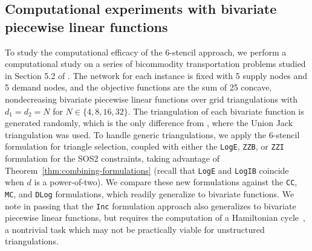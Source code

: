 \documentclass[opre,nonblindrev]{informs3} %
\newcommand{\ZZB}{\texttt{ZZB}}
\newcommand{\ZZI}{\texttt{ZZI}}
\newcommand{\MC}{\texttt{MC}}
\newcommand{\CC}{\texttt{CC}}
\newcommand{\Log}{\texttt{LogE}}
\newcommand{\LogIB}{\texttt{LogIB}}
\newcommand{\DLog}{\texttt{DLog}}
\newcommand{\Inc}{\texttt{Inc}}
\begin{document}
\subsection{Computational experiments with bivariate piecewise linear functions} \label{ss:bivariate-computations}
To study the computational efficacy of the 6-stencil approach, we perform a computational study on a series of bicommodity transportation problems studied in Section 5.2 of \cite{Vielma:2010}. The network for each instance is fixed with 5 supply nodes and 5 demand nodes, and the objective functions are the sum of 25 concave, nondecreasing bivariate piecewise linear functions over grid triangulations with $d_1=d_2=N$ for $N \in \{4,8,16,32\}$. The triangulation of each bivariate function is generated randomly, which is the only difference from \citep{Vielma:2010}, where the Union Jack triangulation was used. To handle generic triangulations, we apply the 6-stencil formulation for triangle selection, coupled with either the \Log{}, \ZZB{}, or \ZZI{} formulation for the SOS2 constraints, taking advantage of Theorem~\ref{thm:combining-formulations} (recall that \Log{} and \LogIB{} coincide when $d$ is a power-of-two). We compare these new formulations against the \CC{}, \MC{}, and \DLog{} formulations, which readily generalize to bivariate functions. We note in passing that the \Inc{} formulation approach also generalizes to bivariate piecewise linear functions, but requires the computation of a Hamiltonian cycle~\citep{Wilson:1998}, a nontrivial task which may not be practically viable for unstructured triangulations.
\end{document}
